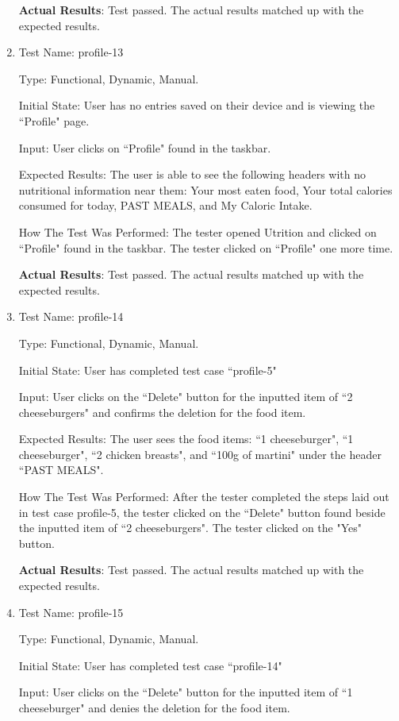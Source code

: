 \documentclass[12pt, titlepage]{article}
\begin{document}
\begin{enumerate}
		\textbf{Actual Results}: Test passed. The actual results matched up with the expected results.
		
		\item{Test Name: profile-13}
		
		Type: Functional, Dynamic, Manual.
		
		Initial State: User has no entries saved on their device and is viewing the ``Profile" page.
		
		Input: User clicks on ``Profile" found in the taskbar.
		
		Expected Results: The user is able to see the following headers with no nutritional information near them: Your most eaten food, Your total calories consumed for today, PAST MEALS, and My Caloric Intake.
		
		How The Test Was Performed: The tester opened Utrition and clicked on ``Profile" found in the taskbar. The tester clicked on ``Profile" one more time.
		
		\textbf{Actual Results}: Test passed. The actual results matched up with the expected results.
		
		\item{Test Name: profile-14}
		
		Type: Functional, Dynamic, Manual.
		
		Initial State: User has completed test case ``profile-5"
		
		Input: User clicks on the ``Delete" button for the inputted item of ``2 cheeseburgers" and confirms the deletion for the food item.
		
		Expected Results: The user sees the food items: ``1 cheeseburger", ``1 cheeseburger", ``2 chicken breasts", and ``100g of martini" under the header ``PAST MEALS".
		
		How The Test Was Performed: After the tester completed the steps laid out in test case profile-5, the tester clicked on the ``Delete" button found beside the inputted item of ``2 cheeseburgers". The tester clicked on the "Yes" button.
		
		\textbf{Actual Results}: Test passed. The actual results matched up with the expected results.
		
		\item{Test Name: profile-15}
		
		Type: Functional, Dynamic, Manual.
		
		Initial State: User has completed test case ``profile-14"
		
		Input: User clicks on the ``Delete" button for the inputted item of ``1 cheeseburger" and denies the deletion for the food item.
		

\end{enumerate}
\end{document}
